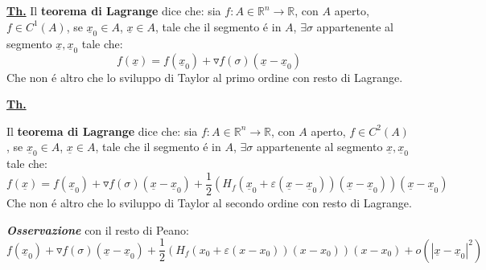 \documentclass[a4paper,10pt]{article} %
\renewcommand{\b}[1]{%
    {\textbf{#1}}}
\renewcommand{\v}[1]{%
    {\underline{#1}}}
\newcommand{\ltheorem}[1]{%
    {\smallbreak\par\tiny\textbf{\underline{Th.}} {#1} \smallbreak\par}}
\newcommand{\ldim}[1]{%
    {\smallbreak\par\tiny\emph{\textbf{Dimostrazione}} {#1} \par}}
\newcommand{\loss}[1]{%
    {\smallbreak\par\tiny\emph{\textbf{Osservazione}} {#1} \par}}
\renewcommand{\ldim}[1]{{}}
\begin{document}
\begin{multicols}{6}
\ltheorem{
    Il \b{teorema di Lagrange} dice che: 
    sia $f:A\in\mathbb{R}^n\rightarrow\mathbb{R}$, con $A$ aperto,
    $f \in C^1(A)$, se $\v{x}_0 \in A$, $ \v{x} \in A$, tale che il 
    segmento é in $A$, $ \exists \sigma $ appartenente al segmento
    $ \v{x}, \v{x}_0 $ tale che:
    \[
        f(\v{x}) = f(\v{x}_0) + \triangledown f (\sigma) (\v{x} - \v{x}_0)
    \]
    Che non é altro che lo sviluppo di Taylor al primo ordine con resto
    di Lagrange. 
    \ldim{
        Poniamo 
        \[
            \v{h} = \v{x} - \v{x}_0
        \]
        In modo tale che il segmento sia rappresentato da $\v{x}_0 + t\v{h}$.
        Allora
        \[
            F \colon [0,2 ] \rightarrow \mathbb{R},
            \quad \quad 
            F(t) \colon = f(\v{x} + t\v{h})
        \]
        Se abbiamo che $f \in C^1$, allora applicando Lagrange:
        \[
            F(1) - F(0) = F'(\varepsilon) (1 - 0) = F'(\varepsilon),
            \quad \text{ con } \varepsilon \in (0, 1)
        \]
        Applicando ancora Lagrange:
        \begin{gather*} 
            f(\v{x}) - f(\v{x}_0) = 
            \triangledown f(\v{x}_0 + \varepsilon \v{h} ) \cdot \v{h} =
            \\
            \sum f_{x_i} (\v{x}_0 + \varepsilon \v{h}_i) \cdot\v{h}_i 
        \end{gather*} 
        Dove $\v{x}_0 + \varepsilon \v{h}_i$ rappresenta un punto 
        del segmento.
    }
}


\ltheorem{ 
    Il \b{teorema di Lagrange} dice che: 
    sia $f:A\in\mathbb{R}^n\rightarrow\mathbb{R}$, con $A$ aperto,
    $f \in C^2(A)$, se $\v{x}_0 \in A$, $ \v{x} \in A$, tale che il 
    segmento é in $A$, $ \exists \sigma $ appartenente al segmento
    $ \v{x}, \v{x}_0 $ tale che:
    \[
        f(\v{x}) = f(\v{x}_0) + \triangledown f (\sigma) (\v{x} - \v{x}_0)
        + \frac{1}{2} ( H_f(\v{x}_0 + \varepsilon
        (\v{x} - \v{x}_0))(\v{x} - \v{x}_0)) (\v{x} - \v{x}_0)
    \]
    Che non é altro che lo sviluppo di Taylor al secondo ordine con resto
    di Lagrange. 
    \loss{
        con il resto di Peano:
        \[
            f(\v{x}_0) + \triangledown f (\sigma) (\v{x} - \v{x}_0)
            + \frac{1}{2} ( H_f(x_0 + \varepsilon
            (x - x_0))(x - x_0)) (x - x_0) +
            o(| \v{x} - \v{x}_0 |^2)
        \]
    }
    \ldim{
        Se $f \in C^2(A) \implies F \in C^2([0, 1]) $, e quindi
        \[
            F(t) = F(0) + F'(0)t + \frac{1}{2}F''(\varepsilon)t^2 \text{ con }
            \quad \varepsilon \in (0, t)
        \]
        Imponendo $t = 1$:
        \begin{eqnarray*}
            f(\v{x}) &=& f(\v{x}_0) + \triangledown f(\v{x}_0)(\v{x} - \v{x}_0) 
            + \frac{1}{2} F''(\varepsilon)
            \\
            &=& f(\v{x}_0) + \triangledown f(\v{x}_0)(\v{x} - \v{x}_0) +
            \frac{1}{2}(H_f(\v{x}_0 + \varepsilon 
            (\v{x} - \v{x}_0)) (\v{x} - \v{x}_0))(\v{x} - \v{x}_0)
        \end{eqnarray*}
    }
}


\end{multicols}
\end{document}
